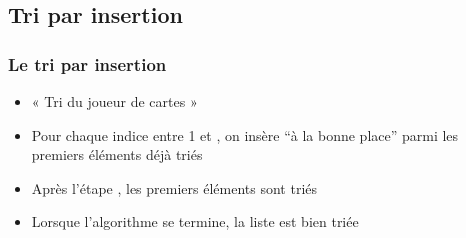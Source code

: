 \documentclass[12pt]{linfo-beamer}
\begin{document}
\subsection{Tri par insertion}
\label{sub:tri_par_insertion}

\begin{frame}
  \frametitle{Le tri par insertion}

  \begin{itemize}

  \item « Tri du joueur de cartes »

    \medskip

  \item Pour chaque indice  entre 1 et , on
    insère  ``à la bonne place'' parmi les 
    premiers éléments déjà triés

    \medskip

  \item Après l'étape , les  premiers éléments sont triés
  \item Lorsque l'algorithme se termine, la liste est bien triée

  \end{itemize}
\end{frame}

\end{document}
